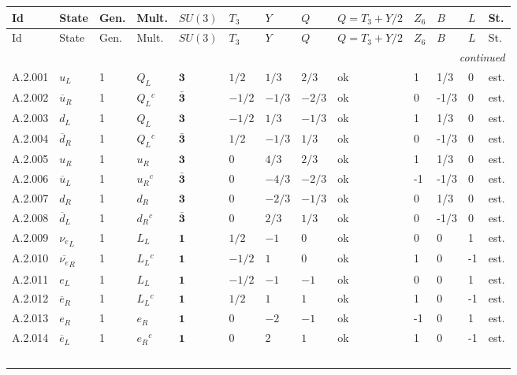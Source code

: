 {\scriptsize\setlength{\tabcolsep}{3pt}
\begin{longtable}{@{}lllllllllllll@{}}
\toprule
Id & State & Gen. & Mult. & $SU(3)$ & $T_3$ & $Y$ & $Q$ & $Q{=}T_3{+}Y/2$ & $Z_6$ & $B$ & $L$ & St. \\
\midrule\endfirsthead
\toprule
Id & State & Gen. & Mult. & $SU(3)$ & $T_3$ & $Y$ & $Q$ & $Q{=}T_3{+}Y/2$ & $Z_6$ & $B$ & $L$ & St. \\
\midrule\endhead
\midrule\multicolumn{13}{r}{\emph{continued}}\\\endfoot
\bottomrule\endlastfoot
A.2.001 & ${u}_L$ & 1 & $Q_L$ & $\mathbf{3}$ & $1/2$ & $1/3$ & $2/3$ & ok & 1 & 1/3 & 0 & est. \\
A.2.002 & $\overline{u}_{R}$ & 1 & $Q_L$$^{c}$ & $\bar{\mathbf{3}}$ & $-1/2$ & $-1/3$ & $-2/3$ & ok & 0 & -1/3 & 0 & est. \\
A.2.003 & ${d}_L$ & 1 & $Q_L$ & $\mathbf{3}$ & $-1/2$ & $1/3$ & $-1/3$ & ok & 1 & 1/3 & 0 & est. \\
A.2.004 & $\overline{d}_{R}$ & 1 & $Q_L$$^{c}$ & $\bar{\mathbf{3}}$ & $1/2$ & $-1/3$ & $1/3$ & ok & 0 & -1/3 & 0 & est. \\
A.2.005 & ${u}_R$ & 1 & $u_R$ & $\mathbf{3}$ & $0$ & $4/3$ & $2/3$ & ok & 1 & 1/3 & 0 & est. \\
A.2.006 & $\overline{u}_{L}$ & 1 & $u_R$$^{c}$ & $\bar{\mathbf{3}}$ & $0$ & $-4/3$ & $-2/3$ & ok & -1 & -1/3 & 0 & est. \\
A.2.007 & ${d}_R$ & 1 & $d_R$ & $\mathbf{3}$ & $0$ & $-2/3$ & $-1/3$ & ok & 0 & 1/3 & 0 & est. \\
A.2.008 & $\overline{d}_{L}$ & 1 & $d_R$$^{c}$ & $\bar{\mathbf{3}}$ & $0$ & $2/3$ & $1/3$ & ok & 0 & -1/3 & 0 & est. \\
A.2.009 & ${\nu_e}_L$ & 1 & $L_L$ & $\mathbf{1}$ & $1/2$ & $-1$ & $0$ & ok & 0 & 0 & 1 & est. \\
A.2.010 & $\overline{\nu_e}_{R}$ & 1 & $L_L$$^{c}$ & $\mathbf{1}$ & $-1/2$ & $1$ & $0$ & ok & 1 & 0 & -1 & est. \\
A.2.011 & ${e}_L$ & 1 & $L_L$ & $\mathbf{1}$ & $-1/2$ & $-1$ & $-1$ & ok & 0 & 0 & 1 & est. \\
A.2.012 & $\overline{e}_{R}$ & 1 & $L_L$$^{c}$ & $\mathbf{1}$ & $1/2$ & $1$ & $1$ & ok & 1 & 0 & -1 & est. \\
A.2.013 & ${e}_R$ & 1 & $e_R$ & $\mathbf{1}$ & $0$ & $-2$ & $-1$ & ok & -1 & 0 & 1 & est. \\
A.2.014 & $\overline{e}_{L}$ & 1 & $e_R$$^{c}$ & $\mathbf{1}$ & $0$ & $2$ & $1$ & ok & 1 & 0 & -1 & est. \\
$$
\end{longtable}}
